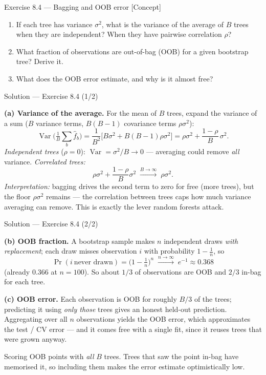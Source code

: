 \documentclass[aspectratio=169,11pt]{beamer}
\begin{document}
\begin{frame}{Exercise 8.4 --- Bagging and OOB error [Concept]}
\begin{exercise}
\begin{enumerate}
  \item If each tree has variance $\sigma^2$, what is the variance of the average of $B$ trees when they are independent? When they have pairwise correlation $\rho$?
  \item What fraction of observations are out-of-bag (OOB) for a given bootstrap tree? Derive it.
  \item What does the OOB error estimate, and why is it almost free?
\end{enumerate}
\end{exercise}
\end{frame}

\begin{frame}{Solution --- Exercise 8.4 (1/2)}
\begin{solutionbox}
\textbf{(a) Variance of the average.} For the mean of $B$ trees, expand the variance of a sum ($B$ variance terms, $B(B-1)$ covariance terms $\rho\sigma^2$):
\[ \operatorname{Var}\!\Big(\tfrac1B\sum_b \hat f_b\Big)=\frac{1}{B^2}\Big[B\sigma^2+B(B-1)\rho\sigma^2\Big]
=\rho\sigma^2+\frac{1-\rho}{B}\,\sigma^2. \]
\emph{Independent trees} ($\rho=0$): $\operatorname{Var}=\sigma^2/B\to0$ --- averaging could remove \emph{all} variance. \emph{Correlated trees:}
\[ \rho\sigma^2+\frac{1-\rho}{B}\sigma^2 \;\xrightarrow{B\to\infty}\; \rho\sigma^2. \]
\emph{Interpretation:} bagging drives the second term to zero for free (more trees), but the floor $\rho\sigma^2$ remains --- the correlation between trees caps how much variance averaging can remove. This is exactly the lever random forests attack.
\end{solutionbox}
\end{frame}

\begin{frame}{Solution --- Exercise 8.4 (2/2)}
\begin{solutionbox}
\textbf{(b) OOB fraction.} A bootstrap sample makes $n$ independent draws \emph{with replacement}; each draw misses observation $i$ with probability $1-\tfrac1n$, so
\[ \Pr(i\ \text{never drawn})=\Big(1-\tfrac1n\Big)^{n}\;\xrightarrow{n\to\infty}\; e^{-1}\approx 0.368 \]
(already $0.366$ at $n=100$). So about $1/3$ of observations are OOB and $2/3$ in-bag for each tree.

\medskip
\textbf{(c) OOB error.} Each observation is OOB for roughly $B/3$ of the trees; predicting it using \emph{only those} trees gives an honest held-out prediction. Aggregating over all $n$ observations yields the OOB error, which approximates the test / CV error --- and it comes free with a single fit, since it reuses trees that were grown anyway.
\end{solutionbox}
\begin{mistake}
Scoring OOB points with \emph{all} $B$ trees. Trees that saw the point in-bag have memorised it, so including them makes the error estimate optimistically low.
\end{mistake}
\end{frame}
\end{document}
